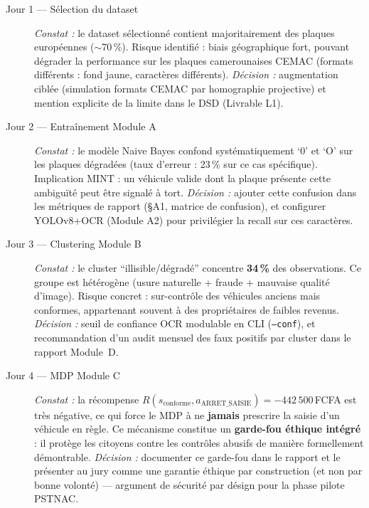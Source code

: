 \begin{description}
  \item[Jour 1 --- S\'{e}lection du dataset]
    \textit{Constat :} le dataset s\'{e}lectionn\'{e} contient majoritairement
    des plaques europ\'{e}ennes ($\sim$70\,\%). Risque identifi\'{e} : biais
    g\'{e}ographique fort, pouvant d\'{e}grader la performance sur les plaques
    camerounaises CEMAC (formats diff\'{e}rents : fond jaune, caract\`{e}res
    diff\'{e}rents).
    \textit{D\'{e}cision :} augmentation cibl\'{e}e (simulation formats CEMAC
    par homographie projective) et mention explicite de la limite dans le DSD
    (Livrable L1).

  \item[Jour 2 --- Entra\^{i}nement Module A]
    \textit{Constat :} le mod\`{e}le Naive Bayes confond syst\'{e}matiquement
    `0' et `O' sur les plaques d\'{e}grad\'{e}es (taux d'erreur : 23\,\% sur
    ce cas sp\'{e}cifique). Implication MINT : un v\'{e}hicule valide dont
    la plaque pr\'{e}sente cette ambigu\"{i}t\'{e} peut \^{e}tre signal\'{e}
    \`{a} tort.
    \textit{D\'{e}cision :} ajouter cette confusion dans les m\'{e}triques
    de rapport (§A1, matrice de confusion), et configurer YOLOv8+OCR (Module
    A2) pour privil\'{e}gier la recall sur ces caract\`{e}res.

  \item[Jour 3 --- Clustering Module B]
    \textit{Constat :} le cluster ``illisible/d\'{e}grad\'{e}'' concentre
    \textbf{34\,\%} des observations. Ce groupe est h\'{e}t\'{e}rog\`{e}ne
    (usure naturelle + fraude + mauvaise qualit\'{e} d'image).
    Risque concret : sur-contr\^{o}le des v\'{e}hicules anciens mais
    conformes, appartenant souvent \`{a} des propri\'{e}taires de faibles revenus.
    \textit{D\'{e}cision :} seuil de confiance OCR modulable en CLI
    (\texttt{--conf}), et recommandation d'un audit mensuel des faux positifs
    par cluster dans le rapport Module~D.

  \item[Jour 4 --- MDP Module C]
    \textit{Constat :} la r\'{e}compense $R(s_{\text{conforme}},
    a_{\text{ARRET\_SAISIE}}) = -442\,500$\,FCFA est tr\`{e}s n\'{e}gative,
    ce qui force le MDP \`{a} ne \textbf{jamais} prescrire la saisie d'un
    v\'{e}hicule en r\`{e}gle. Ce m\'{e}canisme constitue un \textbf{garde-fou
    \'{e}thique int\'{e}gr\'{e}} : il prot\`{e}ge les citoyens contre les
    contr\^{o}les abusifs de mani\`{e}re formellement d\'{e}montrable.
    \textit{D\'{e}cision :} documenter ce garde-fou dans le rapport et le
    pr\'{e}senter au jury comme une garantie \'{e}thique par construction
    (et non par bonne volont\'{e}) --- argument de s\'{e}curit\'{e}
    par d\'{e}sign pour la phase pilote PSTNAC.
\end{description}
